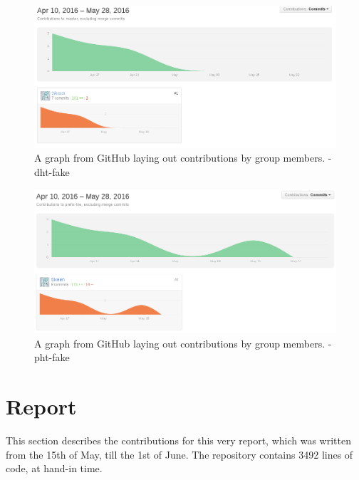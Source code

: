 \begin{figure}[H]
  \centering
    \includegraphics[width=\linewidth]{gfx/dht-fake}
    \caption{A graph from GitHub laying out contributions by group members. - dht-fake}
  \label{fig:music-stramer-library}
\end{figure}

\begin{figure}[H]
  \centering
    \includegraphics[width=\linewidth]{gfx/pht-fake}
    \caption{A graph from GitHub laying out contributions by group members. - pht-fake}
  \label{fig:music-stramer-library}
\end{figure}

\section{Report}
This section describes the contributions for this very report, which was
written from the 15th of May, till the 1st of June.
\newline\newline
The repository contains 3492 lines of code, at hand-in time.


